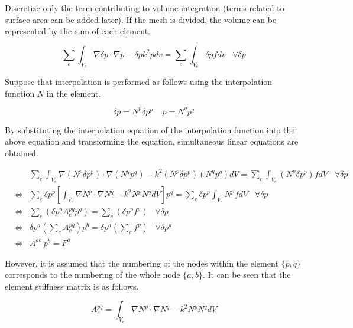 Discretize only the term contributing to volume integration (terms related to surface area can be added later). If the mesh is divided, the volume can be represented by the sum of each element.

\begin{equation}
\sum_e\int_{V_e} \nabla\delta p \cdot\nabla p -  \delta p k^2 p  dv = \sum_e\int_{V_e} \delta p f dv\;\;\;\forall \delta p
\end{equation}

Suppose that interpolation is performed as follows using the interpolation function $N$ in the element.

\begin{equation}
\delta p = N^p \delta p^p\;\;\;\; p = N^q p^q
\end{equation}

By substituting the interpolation equation of the interpolation function into the above equation and transforming the equation, simultaneous linear equations are obtained.

\begin{eqnarray}
&&\sum_e\int_{V_e} \nabla(N^p\delta p^p) \cdot\nabla (N^q p^q) -  k^2(N^p\delta p^p) (N^q p^q)  dV = \sum_e\int_{V_e} (N^p\delta p^p) f dV\;\;\;\forall \delta p\\
&\Leftrightarrow& \sum_e \delta p^p \left[\int_{V_e} \nabla N^p \cdot\nabla N^q -  k^2N^pN^qdV\right] p^q  = \sum_e\delta p^p\int_{V_e} N^p f dV\;\;\;\forall \delta p\\
&\Leftrightarrow& \sum_e \left(\delta p^p A_e^{pq} p^q \right) = \sum_e\left(\delta p^p f^p\right)\;\;\;\forall \delta p\\
&\Leftrightarrow& \delta p^a\left(\sum_e A_e^{pq}\right) p^b = \delta p^a \left(\sum_ef^p\right)\;\;\;\forall \delta p^a\\
&\Leftrightarrow& A^{ab}\ p^b = F^a
\end{eqnarray}

However, it is assumed that the numbering of the nodes within the element $\{p,q\}$ corresponds to the numbering of the whole node $\{a,b\}$.
It can be seen that the element stiffness matrix is ​​as follows.


\begin{tcolorbox}[title=Element Stiffness Matrix (element stiffness matrix)]
\begin{equation}
A_e^{pq} = \int_{V_e} \nabla N^p \cdot\nabla N^q -  k^2N^pN^qdV
\end{equation}
\end{tcolorbox}


